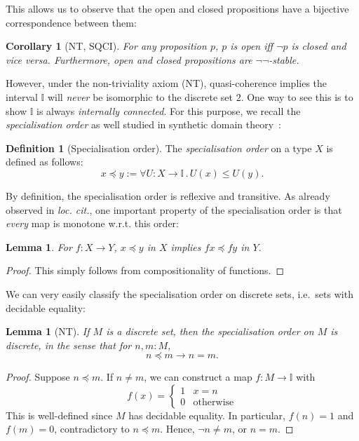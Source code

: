 \documentclass[12pt]{amsart}
\newtheorem{lemma}[theorem]{Lemma}
\newtheorem{corollary}[theorem]{Corollary}
\theoremstyle{definition}
\newtheorem{definition}[theorem]{Definition}
\newcommand{\mbb}[1]{\mathbb{#1}}
\newcommand{\I}{\mbb I}
\newcommand{\other}{\mathrm{otherwise}}
\newcommand{\dneg}{\neg\neg}
\newcommand{\fa}[2]{\forall #1\!\colon\!\!#2\mathpunct{.}}
\begin{document}
This allows us to observe that the open and closed propositions have a bijective correspondence between them:

\begin{corollary}[NT, SQCI]\label{cor:opendnegclose}
  For any proposition $p$, $p$ is open iff $\neg p$ is closed and vice versa. Furthermore, open and closed propositions are $\dneg$-stable.
\end{corollary}

However, under the non-triviality axiom (NT), quasi-coherence implies the interval $\I$ will \emph{never} be isomorphic to the discrete set $2$. One way to see this is to show $\I$ is always \emph{internally connected}. For this purpose, we recall the \emph{specialisation order} as well studied in synthetic domain theory~\cite{PhoaWesleyKym-Son1991DtiR}:

\begin{definition}[Specialisation order]\label{defn:specialisation}
  The \emph{specialisation order} on a type $X$ is defined as follows:
  \[ x \preceq y := \fa{U}{X\to\I} U(x) \le U(y). \]
\end{definition}

By definition, the specialisation order is reflexive and transitive. As already observed in \emph{loc. cit.}, one important property of the specialisation order is that \emph{every} map is monotone w.r.t. this order:

\begin{lemma}\label{lem:anymapmonotoneintriscorder}
  For $f : X \to Y$, $x \preceq y$ in $X$ implies $fx \preceq fy$ in $Y$.
\end{lemma}
\begin{proof}
  This simply follows from compositionality of functions.
\end{proof}

We can very easily classify the specialisation order on discrete sets, i.e.\ sets with decidable equality:

\begin{lemma}[NT]\label{lem:discretephoa}
  If $M$ is a discrete set, then the specialisation order on $M$ is discrete, in the sense that for $n,m : M$,
  \[ n \preceq m \to n = m. \]
\end{lemma}
\begin{proof}
  Suppose $n \preceq m$. If $n \neq m$, we can construct a map $f : M \to \I$ with 
  \[ f(x) =
  \begin{cases}
    1 & x = n \\ 
    0 & \other
  \end{cases}
  \]
  This is well-defined since $M$ has decidable equality. In particular, $f(n) = 1$ and $f(m) = 0$, contradictory to $n \preceq m$. Hence, $\neg n \neq m$, or $n = m$.
\end{proof}
\end{document}
